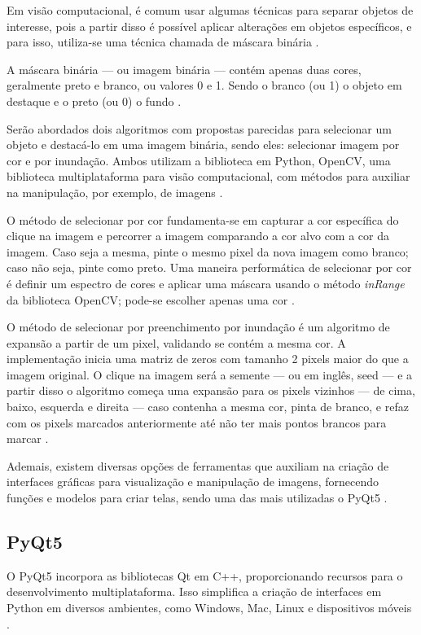 Em visão computacional, é comum usar algumas técnicas para separar objetos de interesse, pois a partir disso é possível aplicar alterações em objetos específicos, e para isso, utiliza-se uma técnica chamada de máscara binária \cite{NVIDIA,Embarcados}.

A máscara binária — ou imagem binária — contém apenas duas cores, geralmente preto e branco, ou valores 0 e 1. Sendo o branco (ou 1) o objeto em destaque e o preto (ou 0) o fundo \cite{Embarcados}.

Serão abordados dois algoritmos com propostas parecidas para selecionar um objeto e destacá-lo em uma imagem binária, sendo eles: selecionar imagem por cor e por inundação. Ambos utilizam a biblioteca em Python, OpenCV, uma biblioteca multiplataforma para visão computacional, com métodos para auxiliar na manipulação, por exemplo, de imagens \cite{OpenCV}.

O método de selecionar por cor fundamenta-se em capturar a cor específica do clique na imagem e percorrer a imagem comparando a cor alvo com a cor da imagem. Caso seja a mesma, pinte o mesmo pixel da nova imagem como branco; caso não seja, pinte como preto. Uma maneira performática de selecionar por cor é definir um espectro de cores e aplicar uma máscara usando o método \textit{inRange} da biblioteca OpenCV; pode-se escolher apenas uma cor \cite{OpenCVInRange}.

O método de selecionar por preenchimento por inundação é um algoritmo de expansão a partir de um pixel, validando se contém a mesma cor. A implementação inicia uma matriz de zeros com tamanho 2 pixels maior do que a imagem original. O clique na imagem será a semente — ou em inglês, seed — e a partir disso o algoritmo começa uma expansão para os pixels vizinhos — de cima, baixo, esquerda e direita — caso contenha a mesma cor, pinta de branco, e refaz com os pixels marcados anteriormente até não ter mais pontos brancos para marcar \cite{OpenCVFloodFill}.

Ademais, existem diversas opções de ferramentas que auxiliam na criação de interfaces gráficas para visualização e manipulação de imagens, fornecendo funções e modelos para criar telas, sendo uma das mais utilizadas o PyQt5 \cite{uniteai2023}.

\subsection{PyQt5}

O PyQt5 incorpora as bibliotecas Qt em C++, proporcionando recursos para o desenvolvimento multiplataforma. Isso simplifica a criação de interfaces em Python em diversos ambientes, como Windows, Mac, Linux e dispositivos móveis \cite{pyqt5}.
